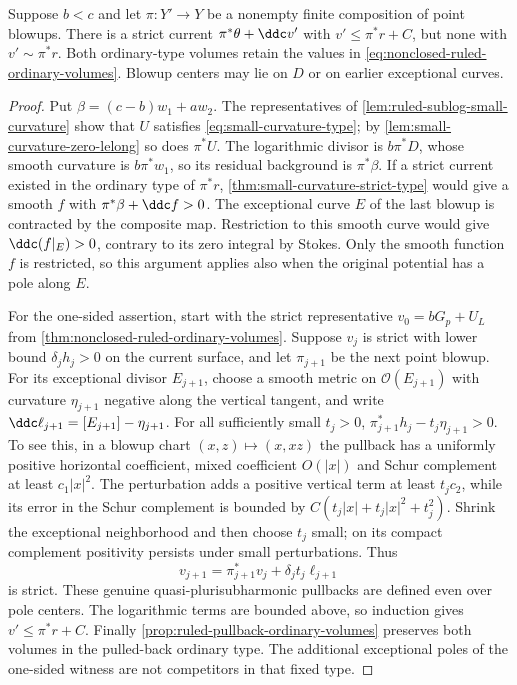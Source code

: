 \begin{proposition}\label{prop:ruled-blowup-strict-type-obstruction}
Suppose $b<c$ and let $\pi:Y'\to Y$ be a nonempty finite composition
of point blowups. There is a strict current $\pi^*\theta+\ddc v'$
with $v'\leq\pi^*r+C$, but none with $v'\sim\pi^*r$.
Both ordinary-type volumes retain the values in
\eqref{eq:nonclosed-ruled-ordinary-volumes}. Blowup centers may lie on
$D$ or on earlier exceptional curves.
\end{proposition}
\begin{proof}
Put $\beta=(c-b)w_1+aw_2$. The representatives of
\cref{lem:ruled-sublog-small-curvature} show that $U$ satisfies
\eqref{eq:small-curvature-type}; by
\cref{lem:small-curvature-zero-lelong} so does $\pi^*U$.
The logarithmic divisor is $b\pi^*D$, whose smooth curvature is
$b\pi^*w_1$, so its residual background is $\pi^*\beta$.
If a strict current existed in the ordinary type of $\pi^*r$,
\cref{thm:small-curvature-strict-type} would give a smooth $f$ with
$\pi^*\beta+\ddc f>0$. The exceptional curve $E$ of the last blowup
is contracted by the composite map. Restriction to this smooth curve
would give $\ddc(f|_E)>0$, contrary to its zero integral by Stokes.
Only the smooth function $f$ is restricted, so this argument applies
also when the original potential has a pole along $E$.

For the one-sided assertion, start with the strict representative
$v_0=bG_p+U_L$ from \cref{thm:nonclosed-ruled-ordinary-volumes}.
Suppose $v_j$ is strict with lower bound $\delta_jh_j>0$ on the
current surface, and let $\pi_{j+1}$ be the next point blowup.
For its exceptional divisor $E_{j+1}$, choose a smooth metric on
$\mathcal O(E_{j+1})$ with curvature $\eta_{j+1}$ negative along the
vertical tangent, and write
$\ddc\ell_{j+1}=[E_{j+1}]-\eta_{j+1}$.
For all sufficiently small $t_j>0$,
$\pi_{j+1}^*h_j-t_j\eta_{j+1}>0$.
To see this, in a blowup chart $(x,z)\mapsto(x,xz)$ the pullback
has a uniformly positive horizontal coefficient, mixed coefficient
$O(|x|)$ and Schur complement at least $c_1|x|^2$. The perturbation
adds a positive vertical term at least $t_jc_2$, while its error in the
Schur complement is bounded by
$C(t_j|x|+t_j|x|^2+t_j^2)$.
Shrink the exceptional neighborhood and then choose $t_j$ small;
on its compact complement positivity persists under small perturbations.
Thus
\[
 v_{j+1}=\pi_{j+1}^*v_j+\delta_jt_j\ell_{j+1}
\]
is strict. These genuine quasi-plurisubharmonic pullbacks are defined
even over pole centers. The logarithmic terms are bounded above,
so induction gives $v'\leq\pi^*r+C$.
Finally \cref{prop:ruled-pullback-ordinary-volumes} preserves both
volumes in the pulled-back ordinary type. The additional exceptional
poles of the one-sided witness are not competitors in that fixed type.
\end{proof}

